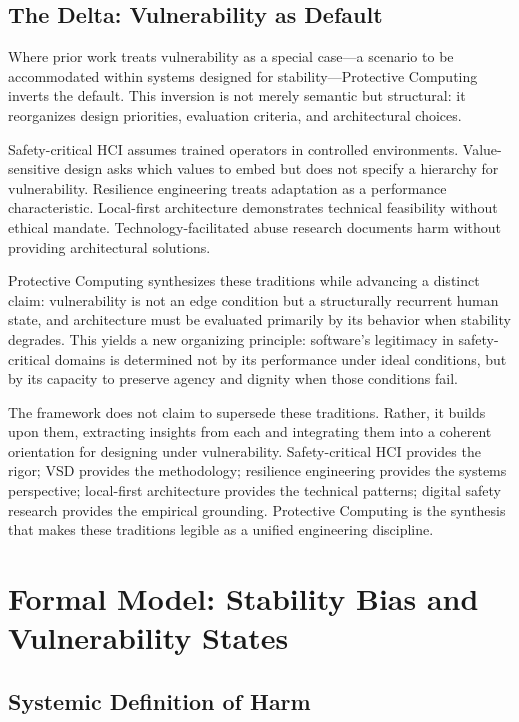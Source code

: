 \documentclass[acmsmall,review]{acmart}
\begin{document}
\subsection{The Delta: Vulnerability as Default}

Where prior work treats vulnerability as a special case---a scenario to be accommodated within systems designed for stability---Protective Computing inverts the default. This inversion is not merely semantic but structural: it reorganizes design priorities, evaluation criteria, and architectural choices.

Safety-critical HCI assumes trained operators in controlled environments. Value-sensitive design asks which values to embed but does not specify a hierarchy for vulnerability. Resilience engineering treats adaptation as a performance characteristic. Local-first architecture demonstrates technical feasibility without ethical mandate. Technology-facilitated abuse research documents harm without providing architectural solutions.

Protective Computing synthesizes these traditions while advancing a distinct claim: vulnerability is not an edge condition but a structurally recurrent human state, and architecture must be evaluated primarily by its behavior when stability degrades. This yields a new organizing principle: software's legitimacy in safety-critical domains is determined not by its performance under ideal conditions, but by its capacity to preserve agency and dignity when those conditions fail.

The framework does not claim to supersede these traditions. Rather, it builds upon them, extracting insights from each and integrating them into a coherent orientation for designing under vulnerability. Safety-critical HCI provides the rigor; VSD provides the methodology; resilience engineering provides the systems perspective; local-first architecture provides the technical patterns; digital safety research provides the empirical grounding. Protective Computing is the synthesis that makes these traditions legible as a unified engineering discipline.

\section{Formal Model: Stability Bias and Vulnerability States}

\subsection{Systemic Definition of Harm}
\label{sec:stability-bias}
\end{document}
